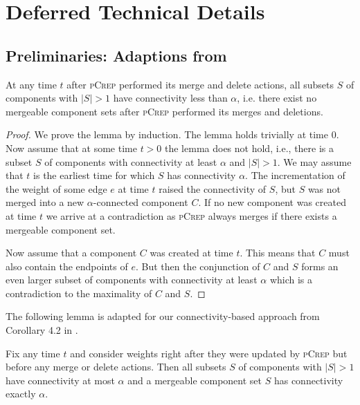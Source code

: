 \documentclass[a4paper,UKenglish,cleveref, autoref, thm-restate,authorcolumns]{lipics-v2019}
\newcommand{\adjDel}{\textsc{pCrep}}
\begin{document}



\appendix


\section{Deferred Technical Details}

\subsection{Preliminaries: Adaptions from \cite{Avin2015}}\label{sec:preli}

\begin{lemma}
	\label{mergeableLemma}
	At any time $t$ after \adjDel{} performed its merge and delete actions, all subsets $S$ of components with $|S|>1$ have connectivity less than $\alpha$, i.e. there exist no mergeable component sets after \adjDel{} performed its merges and deletions.
\end{lemma}
\begin{proof}
	We prove the lemma by induction. The lemma holds trivially at time 0.
	Now assume that at some time $t>0$ the lemma does not hold, i.e., there is a subset $S$ of components with connectivity at least $\alpha$ and $|S|>1$. We may assume that $t$ is the earliest time for which $S$ has connectivity $\alpha$.
The incrementation of the weight of some edge $e$ at time $t$ raised the connectivity of $S$, but $S$ was not merged into a new $\alpha$-connected component $C$. If no new component was created at time $t$ we arrive at a contradiction as \adjDel{} always merges if there exists a mergeable component set.
	
	Now assume that a component $C$ was created at time $t$. This means that $C$ must also contain the endpoints of $e$. But then the conjunction of $C$ and $S$ forms an even larger subset of components with connectivity at least $\alpha$ which is a contradiction to the maximality of $C$ and $S$.
\end{proof}

The following lemma is adapted for our connectivity-based approach from Corollary 4.2 in \cite{Avin2015}.

\begin{lemma}
	\label{mergeable_lemma}
	Fix any time $t$ and consider weights right after they were updated by \adjDel{} but before any merge or delete actions. Then all subsets $S$ of components with $|S|>1$ have connectivity at most $\alpha$ and a mergeable component set $S$ has connectivity exactly $\alpha$.
\end{lemma}
\end{document}
